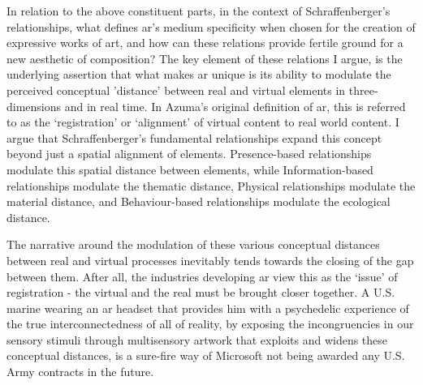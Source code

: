 In relation to the above constituent parts, in the context of Schraffenberger's relationships, what defines \gls{ar}'s medium specificity when chosen for the creation of expressive works of art, and how can these relations provide fertile ground for a new aesthetic of composition? The key element of these relations I argue, is the underlying assertion that what makes \gls{ar} unique is its ability to modulate the perceived conceptual 'distance' between real and virtual elements in three-dimensions and in real time. In Azuma's \citeyearpar[]{azuma1997} original definition of \gls{ar}, this is referred to as the `registration' or `alignment' of virtual content to real world content. I argue that Schraffenberger's fundamental relationships expand this concept beyond just a spatial alignment of elements. Presence-based relationships modulate this spatial distance between elements, while Information-based relationships modulate the thematic distance, Physical relationships modulate the material distance, and Behaviour-based relationships modulate the ecological distance. 

The narrative around the modulation of these various conceptual distances between real and virtual processes inevitably tends towards the closing of the gap between them. After all, the industries developing \gls{ar} view this as the `issue' of registration - the virtual and the real must be brought closer together. A U.S. marine wearing an \gls{ar} headset that provides him with a psychedelic experience of the true interconnectedness of all of reality, by exposing the incongruencies in our sensory stimuli through multisensory artwork that exploits and widens these conceptual distances, is a sure-fire way of Microsoft not being awarded any U.S. Army contracts in the future.

